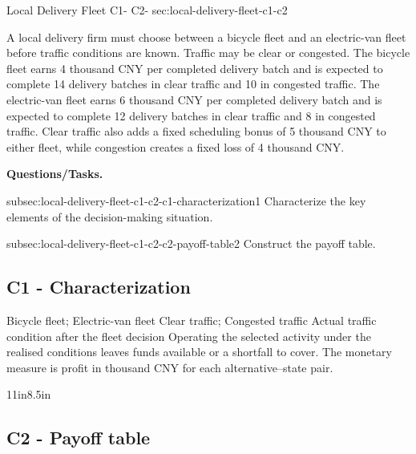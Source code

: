 {		\vspace{-5mm}
		
	}
	
		\sectionScored
		{Local Delivery Fleet}
		{C1- \hspace{2mm} C2-}
		{sec:local-delivery-fleet-c1-c2}
		{
			A local delivery firm must choose between a bicycle fleet and an electric-van fleet before traffic conditions are known. Traffic may be clear or congested. The bicycle fleet earns 4 thousand CNY per completed delivery batch and is expected to complete 14 delivery batches in clear traffic and 10 in congested traffic. The electric-van fleet earns 6 thousand CNY per completed delivery batch and is expected to complete 12 delivery batches in clear traffic and 8 in congested traffic. Clear traffic also adds a fixed scheduling bonus of 5 thousand CNY to either fleet, while congestion creates a fixed loss of 4 thousand CNY.
			
			\textbf{Questions/Tasks.}
			\begin{enumerate}
				\CriterionTask
				{subsec:local-delivery-fleet-c1-c2-c1-characterization}{1}
				{Characterize the key elements of the decision-making situation. }
				
				\CriterionTask
				{subsec:local-delivery-fleet-c1-c2-c2-payoff-table}{2}
				{Construct the payoff table. }
			\end{enumerate}
			
			\label{subsec:local-delivery-fleet-c1-c2-c1-characterization}
			\subsection*{C1 - Characterization }
			
			\DecisionElementsTable
{Bicycle fleet; Electric-van fleet}
{Clear traffic; Congested traffic}
{Actual traffic condition after the fleet decision}
{Operating the selected activity under the realised conditions leaves funds available or a shortfall to cover. The monetary measure is profit in thousand CNY for each alternative--state pair.}

			
			\begin{CalculationLandscape}{11in}{8.5in}
			\label{subsec:local-delivery-fleet-c1-c2-c2-payoff-table}
			\subsection*{C2 - Payoff table }
			

\end{CalculationLandscape}}
